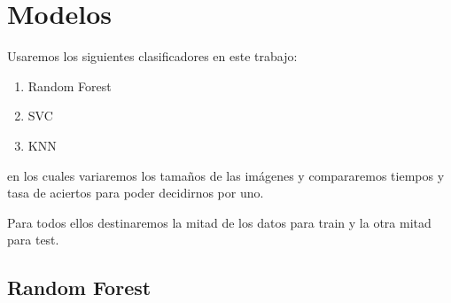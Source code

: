 \documentclass[8pt,a4paper]{{esannV2}}
\begin{document}
\section{Modelos}

Usaremos los siguientes clasificadores en este trabajo:
\begin{enumerate}
\item Random Forest
\item SVC
\item KNN
\end{enumerate}
en los cuales variaremos los tamaños de las imágenes y compararemos tiempos y tasa de aciertos para poder decidirnos por uno.

Para todos ellos destinaremos la mitad de los datos para train y la otra mitad para test.

\subsection{Random Forest}
\end{document}
